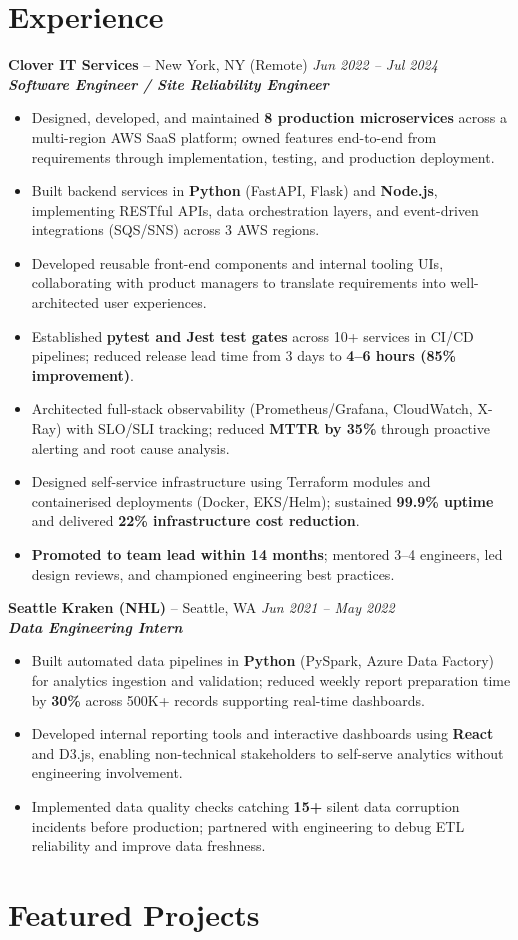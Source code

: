\documentclass[10pt,a4paper]{article}
\newcommand{\jobentry}[4]{%
  \Needspace{3\baselineskip}%
  \textbf{#1} -- #2 \hfill \textit{#3}\\[-0.15em]
  \textit{#4}\\[-0.25em]
}
\begin{document}
\section*{Experience}
\jobentry{Clover IT Services}{New York, NY (Remote)}{Jun 2022 -- Jul 2024}{\textbf{\textit{Software Engineer / Site Reliability Engineer}}}
\begin{itemize}
  \item Designed, developed, and maintained \textbf{8 production microservices} across a multi-region AWS SaaS platform; owned features end-to-end from requirements through implementation, testing, and production deployment.
  \item Built backend services in \textbf{Python} (FastAPI, Flask) and \textbf{Node.js}, implementing RESTful APIs, data orchestration layers, and event-driven integrations (SQS/SNS) across 3 AWS regions.
  \item Developed reusable front-end components and internal tooling UIs, collaborating with product managers to translate requirements into well-architected user experiences.
  \item Established \textbf{pytest and Jest test gates} across 10+ services in CI/CD pipelines; reduced release lead time from 3 days to \textbf{4--6 hours (85\% improvement)}.
  \item Architected full-stack observability (Prometheus/Grafana, CloudWatch, X-Ray) with SLO/SLI tracking; reduced \textbf{MTTR by 35\%} through proactive alerting and root cause analysis.
  \item Designed self-service infrastructure using Terraform modules and containerised deployments (Docker, EKS/Helm); sustained \textbf{99.9\% uptime} and delivered \textbf{22\% infrastructure cost reduction}.
  \item \textbf{Promoted to team lead within 14 months}; mentored 3--4 engineers, led design reviews, and championed engineering best practices.
\end{itemize}
\jobentry{Seattle Kraken (NHL)}{Seattle, WA}{Jun 2021 -- May 2022}{\textbf{\textit{Data Engineering Intern}}}
\begin{itemize}
  \item Built automated data pipelines in \textbf{Python} (PySpark, Azure Data Factory) for analytics ingestion and validation; reduced weekly report preparation time by \textbf{30\%} across 500K+ records supporting real-time dashboards.
  \item Developed internal reporting tools and interactive dashboards using \textbf{React} and D3.js, enabling non-technical stakeholders to self-serve analytics without engineering involvement.
  \item Implemented data quality checks catching \textbf{15+} silent data corruption incidents before production; partnered with engineering to debug ETL reliability and improve data freshness.
\end{itemize}

\clearpage
\section*{Featured Projects}
\end{document}
